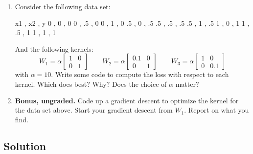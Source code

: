 \documentclass[submit]{harvardml}
\begin{document}
\begin{problem}
\begin{enumerate}
\item Consider the following data set:
\begin{csv}
x1 , x2 , y 
  0 , 0 , 0
  0 , .5 , 0
  0 , 1 , 0 
  .5 , 0 , .5
  .5 , .5 , .5
  .5 , 1 , .5
  1 , 0 , 1
  1 , .5 , 1
  1 , 1 , 1 
\end{csv}
And the following kernels:
\begin{equation*} 
W_1 = \alpha \begin{bmatrix}
  1 & 0 \\
  0 & 1 
\end{bmatrix}
\qquad
W_2 = \alpha \begin{bmatrix}
  0.1 & 0 \\
  0 & 1 
\end{bmatrix}
\qquad
W_3 = \alpha \begin{bmatrix}
  1 & 0 \\
  0 & 0.1 
\end{bmatrix}
\end{equation*} 
with $\alpha = 10$. Write some code to compute the loss with respect
to each kernel.  Which does best?  Why?  Does the choice of $\alpha$
matter? 


\item \textbf{Bonus, ungraded.}  Code up a gradient descent to
  optimize the kernel for the data set above.  Start your gradient
  descent from $W_1$.  Report on what you find.
  
\end{enumerate}

\end{problem}

\subsection*{Solution}





\newpage
\end{document}
